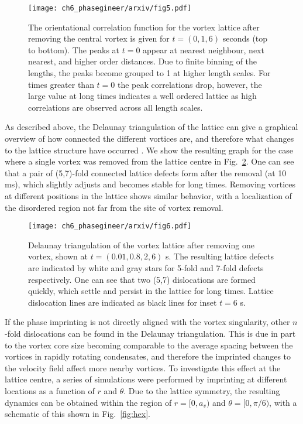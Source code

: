 \begin{figure}\centering
    \texttt{[image: ch6\_phasegineer/arxiv/fig5.pdf]}
    \caption{The orientational correlation function for the vortex lattice after removing the central vortex is given for $t=(0,1,6)$ seconds (top to bottom). The peaks at $t=0$ appear at nearest neighbour, next nearest, and higher order distances. Due to finite binning of the lengths, the peaks become grouped to 1 at higher length scales. For times greater than $t=0$ the peak correlations drop, however, the large value at long times indicates a well ordered lattice as high correlations are observed across all length scales.}\label{fig:g6}
\end{figure}

As described above, the Delaunay triangulation of the lattice can give a graphical overview of how connected the different vortices are, and therefore what changes to the lattice structure have occurred \cite{Guillamon_nat_2014}. We show the resulting graph for the case where a single vortex was removed from the lattice centre in Fig.~\ref{fig:deltri_1vtx}. One can see that a pair of (5,7)-fold connected lattice defects form after the removal (at 10 ms), which slightly adjusts and becomes stable for long times. Removing vortices at different positions in the lattice shows similar behavior, with a localization of the disordered region not far from the site of vortex removal.

\begin{figure}\centering
    \texttt{[image: ch6\_phasegineer/arxiv/fig6.pdf]}
    \caption{Delaunay triangulation of the vortex lattice after removing one vortex, shown at $t=(0.01,0.8,2,6)$ s. The resulting lattice defects are indicated by white and gray stars for 5-fold and 7-fold defects respectively. One can see that two (5,7) dislocations are formed quickly, which settle and persist in the lattice for long times. Lattice dislocation lines are indicated as black lines for inset $t=6$ s.}\label{fig:deltri_1vtx}
\end{figure}

If the phase imprinting is not directly aligned with the vortex singularity, other $n$-fold dislocations can be found in the Delaunay triangulation. This is due in part to the vortex core size becoming comparable to the average spacing between the vortices in rapidly rotating condensates, and therefore the imprinted changes to the velocity field affect more nearby vortices. To investigate this effect at the lattice centre, a series of simulations were performed by imprinting at different locations as a function of $r$ and $\theta$. Due to the lattice symmetry, the resulting dynamics can be obtained within the region of $r=[0,a_v)$ and $\theta=[0,\pi/6)$, with a schematic of this shown in Fig.~\ref{fig:hex}.

